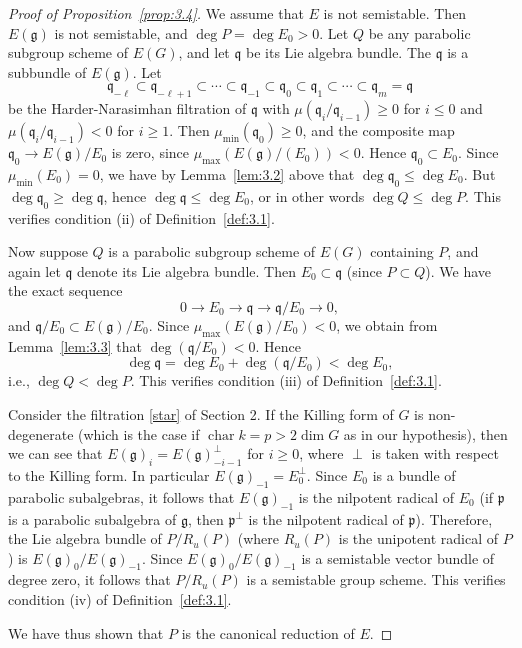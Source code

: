 \documentclass[12pt]{article}
\begin{document}
\begin{proof}[Proof of Proposition~\ref{prop:3.4}]
We assume that $E$ is not semistable. Then $E(\mathfrak{g})$ is not semistable, and $\deg P = \deg E_0 > 0$. Let $Q$ be any parabolic subgroup scheme of $E(G)$, and let $\mathfrak{q}$ be its Lie algebra bundle. The $\mathfrak{q}$ is a subbundle of $E(\mathfrak{g})$. Let
\[
\mathfrak{q}_{-\ell} \subset \mathfrak{q}_{-\ell+1} \subset \cdots \subset \mathfrak{q}_{-1} \subset \mathfrak{q}_0 \subset \mathfrak{q}_1 \subset \cdots \subset \mathfrak{q}_m = \mathfrak{q}
\]
be the Harder-Narasimhan filtration of $\mathfrak{q}$ with $\mu(\mathfrak{q}_i / \mathfrak{q}_{i-1}) \geq 0$ for $i \leq 0$ and $\mu(\mathfrak{q}_i / \mathfrak{q}_{i-1}) < 0$ for $i \geq 1$. Then $\mu_{\min}(\mathfrak{q}_0) \geq 0$, and the composite map $\mathfrak{q}_0 \to E(\mathfrak{g}) / E_0$ is zero, since $\mu_{\max}(E(\mathfrak{g}) / (E_0)) < 0$. Hence $\mathfrak{q}_0 \subset E_0$. Since $\mu_{\min}(E_0) = 0$, we have by Lemma~\ref{lem:3.2} above that $\deg \mathfrak{q}_0 \leq \deg E_0$. But $\deg \mathfrak{q}_0 \geq \deg \mathfrak{q}$, hence $\deg \mathfrak{q} \leq \deg E_0$, or in other words $\deg Q \leq \deg P$. This verifies condition (ii) of Definition~\ref{def:3.1}.

Now suppose $Q$ is a parabolic subgroup scheme of $E(G)$ containing $P$, and again let $\mathfrak{q}$ denote its Lie algebra bundle. Then $E_0 \subset \mathfrak{q}$ (since $P \subset Q$). We have the exact sequence
\[
0 \to E_0 \to \mathfrak{q} \to \mathfrak{q} / E_0 \to 0,
\]
and $\mathfrak{q} / E_0 \subset E(\mathfrak{g}) / E_0$. Since $\mu_{\max}(E(\mathfrak{g}) / E_0) < 0$, we obtain from Lemma~\ref{lem:3.3} that $\deg(\mathfrak{q} / E_0) < 0$. Hence
\[
\deg \mathfrak{q} = \deg E_0 + \deg(\mathfrak{q} / E_0) < \deg E_0,
\]
i.e., $\deg Q < \deg P$. This verifies condition (iii) of Definition~\ref{def:3.1}.

Consider the filtration \eqref{star} of Section 2. If the Killing form of $G$ is non-degenerate (which is the case if $\operatorname{char} k = p > 2 \dim G$ as in our hypothesis), then we can see that $E(\mathfrak{g})_i = E(\mathfrak{g})_{-i-1}^{\perp}$ for $i \geq 0$, where $\perp$ is taken with respect to the Killing form. In particular $E(\mathfrak{g})_{-1} = E_0^\perp$. Since $E_0$ is a bundle of parabolic subalgebras, it follows that $E(\mathfrak{g})_{-1}$ is the nilpotent radical of $E_0$ (if $\mathfrak{p}$ is a parabolic subalgebra of $\mathfrak{g}$, then $\mathfrak{p}^\perp$ is the nilpotent radical of $\mathfrak{p}$). Therefore, the Lie algebra bundle of $P / R_u(P)$ (where $R_u(P)$ is the unipotent radical of $P$) is $E(\mathfrak{g})_0 / E(\mathfrak{g})_{-1}$. Since $E(\mathfrak{g})_0 / E(\mathfrak{g})_{-1}$ is a semistable vector bundle of degree zero, it follows that $P / R_u(P)$ is a semistable group scheme. This verifies condition (iv) of Definition~\ref{def:3.1}.

We have thus shown that $P$ is the canonical reduction of $E$.
\end{proof}
\end{document}
